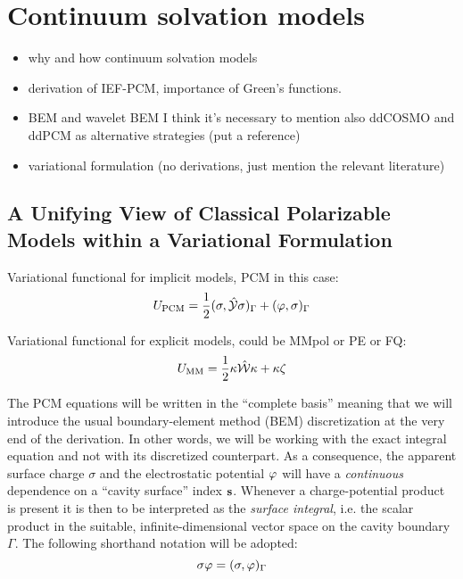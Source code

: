 \chapter{Continuum solvation models}\label{ch:CSM}


\begin{itemize}
    \item why and how continuum solvation models
    \item derivation of \acs{IEF}-\acs{PCM}, importance of Green's
      functions.
    \item \ac{BEM} and wavelet \acs{BEM} I think it's necessary to
      mention also ddCOSMO and ddPCM as alternative strategies (put a
      reference)
    \item variational formulation (no derivations, just mention the
      relevant literature)
\end{itemize}

\pagebreak

\section[Variational Formulation of Classical Polarizable Models]{
A Unifying View of Classical Polarizable Models within a Variational Formulation}
\label{sec:variational}

Variational functional for implicit models, \acs{PCM} in this case:
\begin{equation}
 U_\mathrm{PCM} = \frac{1}{2}(\sigma, \hat{\mathcal{Y}}\sigma)_{\Gamma} + (\varphi, \sigma)_{\Gamma}
\end{equation}

Variational functional for explicit models, could be MMpol or PE or FQ:
\begin{equation}
  U_\mathrm{MM} = \frac{1}{2}\kappa\hat{\mathcal{W}}\kappa + \kappa\zeta
\end{equation}

The PCM equations will be written in the ``complete basis'' meaning that
we will introduce the usual boundary-element method (BEM) discretization
at the very end of the derivation. In other words, we will be working
with the exact integral equation and not with its discretized
counterpart. As a consequence, the apparent surface charge $\sigma$ and
the electrostatic potential $\varphi$ will have a \emph{continuous}
dependence on a ``cavity surface'' index $\mathbf{s}$. Whenever a
charge-potential product is present it is then to be interpreted as the
\emph{surface integral}, i.e. the scalar product in the suitable,
infinite-dimensional vector space on the cavity boundary $\Gamma$. The
following shorthand notation will be adopted:
\begin{equation}
 \sigma\varphi = (\sigma, \varphi)_{\Gamma}
\end{equation}

